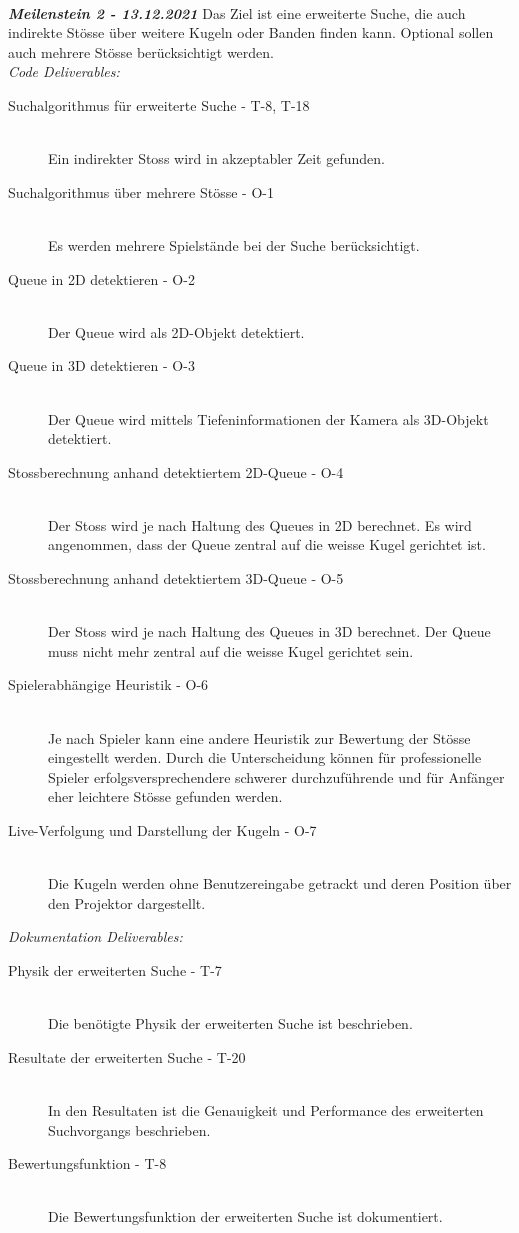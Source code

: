 ~\\

\textit{\textbf{Meilenstein 2 - 13.12.2021}}
Das Ziel ist eine erweiterte Suche, die auch indirekte Stösse über weitere Kugeln oder Banden finden kann.
Optional sollen auch mehrere Stösse berücksichtigt werden.\\
\textit{Code Deliverables:}
\begin{description}
    \item[Suchalgorithmus für erweiterte Suche - T-8, T-18]\hfill \\
    Ein indirekter Stoss wird in akzeptabler Zeit gefunden.
    \item[Suchalgorithmus über mehrere Stösse - O-1]\hfill \\
    Es werden mehrere Spielstände bei der Suche berücksichtigt.
    \item[Queue in 2D detektieren - O-2]\hfill \\
    Der Queue wird als 2D-Objekt detektiert.
    \item[Queue in 3D detektieren - O-3]\hfill \\
    Der Queue wird mittels Tiefeninformationen der Kamera als 3D-Objekt detektiert.
    \item[Stossberechnung anhand detektiertem 2D-Queue - O-4]\hfill \\
    Der Stoss wird je nach Haltung des Queues in 2D berechnet. Es wird angenommen, dass der Queue zentral auf die
    weisse Kugel gerichtet ist.
    \item[Stossberechnung anhand detektiertem 3D-Queue - O-5]\hfill \\
    Der Stoss wird je nach Haltung des Queues in 3D berechnet. Der Queue muss nicht mehr zentral auf die weisse
    Kugel gerichtet sein.
    \item[Spielerabhängige Heuristik - O-6]\hfill \\
    Je nach Spieler kann eine andere Heuristik zur Bewertung der Stösse eingestellt werden. Durch die Unterscheidung
    können für professionelle Spieler erfolgsversprechendere schwerer durchzuführende und für Anfänger
    eher leichtere Stösse gefunden werden.
    \item[Live-Verfolgung und Darstellung der Kugeln - O-7]\hfill \\
    Die Kugeln werden ohne Benutzereingabe getrackt und deren Position über den Projektor dargestellt.
\end{description}
\textit{Dokumentation Deliverables:}
\begin{description}
    \item[Physik der erweiterten Suche - T-7]\hfill \\
    Die benötigte Physik der erweiterten Suche ist beschrieben.
    \item[Resultate der erweiterten Suche - T-20]\hfill \\
    In den Resultaten ist die Genauigkeit und Performance des erweiterten Suchvorgangs
    beschrieben.
    \item[Bewertungsfunktion - T-8]\hfill \\
    Die Bewertungsfunktion der erweiterten Suche ist dokumentiert.
\end{description}

